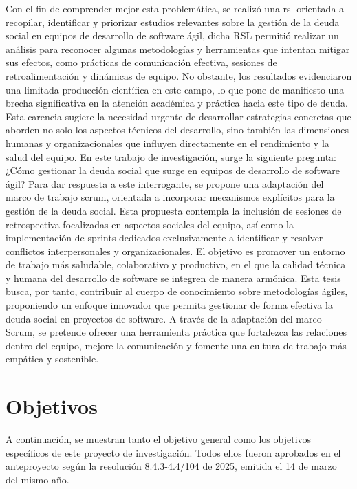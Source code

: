 Con el fin de comprender mejor esta problemática, se realizó una \gls{rsl} orientada a recopilar, identificar y priorizar estudios relevantes sobre la gestión de la deuda social en equipos de desarrollo de software ágil, dicha RSL permitió realizar un análisis para reconocer algunas metodologías y herramientas que intentan mitigar sus efectos, como prácticas de comunicación efectiva, sesiones de retroalimentación y dinámicas de equipo. No obstante, los resultados evidenciaron una limitada producción científica en este campo, lo que pone de manifiesto una brecha significativa en la atención académica y práctica hacia este tipo de deuda. Esta carencia sugiere la necesidad urgente de desarrollar estrategias concretas que aborden no solo los aspectos técnicos del desarrollo, sino también las dimensiones humanas y organizacionales que influyen directamente en el rendimiento y la salud del equipo.
En este trabajo de investigación, surge la siguiente pregunta: ¿Cómo gestionar la deuda social que surge en equipos de desarrollo de software ágil? Para dar respuesta a este interrogante, se propone una adaptación del marco de trabajo \gls{scrum}, orientada a incorporar mecanismos explícitos para la gestión de la deuda social. Esta propuesta contempla la inclusión de sesiones de retrospectiva focalizadas en aspectos sociales del equipo, así como la implementación de sprints dedicados exclusivamente a identificar y resolver conflictos interpersonales y organizacionales. El objetivo es promover un entorno de trabajo más saludable, colaborativo y productivo, en el que la calidad técnica y humana del desarrollo de software se integren de manera armónica.
Esta tesis busca, por tanto, contribuir al cuerpo de conocimiento sobre metodologías ágiles, proponiendo un enfoque innovador que permita gestionar de forma efectiva la deuda social en proyectos de software. A través de la adaptación del marco Scrum, se pretende ofrecer una herramienta práctica que fortalezca las relaciones dentro del equipo, mejore la comunicación y fomente una cultura de trabajo más empática y sostenible.

\section{Objetivos}
A continuación, se muestran tanto el objetivo general como los objetivos específicos de este proyecto de investigación. Todos ellos fueron aprobados en el anteproyecto según la resolución 8.4.3-4.4/104 de 2025, emitida el 14 de marzo del mismo año.

